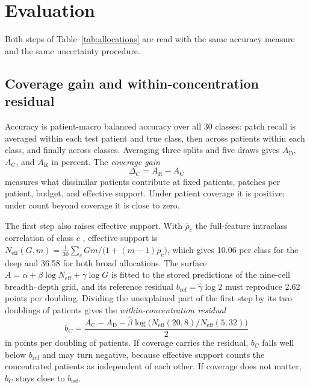 \documentclass[11pt]{article}
\newcommand{\Neff}{N_{\mathrm{eff}}}
\begin{document}
\section{Evaluation}
\label{sec:evaluation}
Both steps of Table~\ref{tab:allocations} are read with the same accuracy measure and the same uncertainty procedure.

\subsection{Coverage gain and within-concentration residual}
\label{sec:contrasts}
Accuracy is patient-macro balanced accuracy over all 30 classes: patch recall is averaged within each test patient and true class, then across patients within each class, and finally across classes. Averaging three splits and five draws gives $A_{\mathrm D}$, $A_{\mathrm C}$, and $A_{\mathrm R}$ in percent. The \emph{coverage gain}
\begin{equation}
 \Delta_C=A_{\mathrm R}-A_{\mathrm C}
 \label{eq:coverage-gain}
\end{equation}
\noindent measures what dissimilar patients contribute at fixed patients, patches per patient, budget, and effective support. Under patient coverage it is positive; under count beyond coverage it is close to zero.

The first step also raises effective support. With $\bar\rho_c$ the full-feature intraclass correlation of class $c$ \citep{queisler2026multidirectionalRedundancy}, effective support is $\Neff(G,m)=\frac{1}{30}\sum_{c}Gm/\bigl(1+(m-1)\bar\rho_c\bigr)$, which gives 10.06 per class for the deep and 36.58 for both broad allocations. The surface $A=\alpha+\beta\log\Neff+\gamma\log G$ is fitted to the stored predictions of the nine-cell breadth--depth grid, and its reference residual $b_{\mathrm{ref}}=\hat\gamma\log 2$ must reproduce 2.62 points per doubling. Dividing the unexplained part of the first step by its two doublings of patients gives the \emph{within-concentration residual}
\begin{equation}
 b_C=\frac{A_{\mathrm C}-A_{\mathrm D}-\hat\beta\log\bigl(\Neff(20,8)/\Neff(5,32)\bigr)}{2}
 \label{eq:within-concentration}
\end{equation}
\noindent in points per doubling of patients. If coverage carries the residual, $b_C$ falls well below $b_{\mathrm{ref}}$ and may turn negative, because effective support counts the concentrated patients as independent of each other. If coverage does not matter, $b_C$ stays close to $b_{\mathrm{ref}}$.
\end{document}
